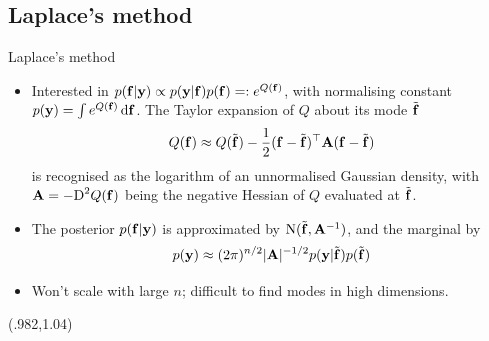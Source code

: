 \subsection{Laplace's method}
\begin{frame}[label=laplace]{Laplace's method}
  \vspace{-15pt}
  \begin{itemize}[<+->]\setlength\itemsep{0.8em}
    \item Interested in $p({\mathbf f}|{\mathbf y}) \propto p({\mathbf y}|{\mathbf f})p({\mathbf f}) =: e^{Q({\mathbf f})}$, with normalising constant $p({\mathbf y}) = \int e^{Q({\mathbf f})} \, \text{d}{\mathbf f}$. The Taylor expansion of $Q$ about its mode $\tilde{{\mathbf f}}$
    \[
      Q({\mathbf f}) \approx Q(\tilde{{\mathbf f}}) - \frac{1}{2} ({\mathbf f} - \tilde{{\mathbf f}})^\top{\mathbf A}({\mathbf f} - \tilde{{\mathbf f}}) 
    \]
    is recognised as the logarithm of an unnormalised Gaussian density, with ${\mathbf A} = -\text{D}^2 Q({\mathbf f})$ being the negative Hessian of $Q$ evaluated at  $\tilde{{\mathbf f}}$.
    \item The posterior $p({\mathbf f}|{\mathbf y})$ is approximated by $\operatorname{N}(\tilde{{\mathbf f}}, {\mathbf A}^{-1})$, and the marginal by
    \[
      p({\mathbf y}) \approx (2\pi)^{n/2} \vert {\mathbf A} \vert^{-1/2}  p({\mathbf y}|\tilde{{\mathbf f}})p(\tilde{{\mathbf f}})
    \]
    \item Won't scale with large $n$; difficult to find modes in high dimensions.
  \end{itemize}
  
  \begin{textblock*}{3cm}(.982\textwidth,1.04\textheight)%
    \hyperlink{quality}{}      
  \end{textblock*}
\end{frame}


